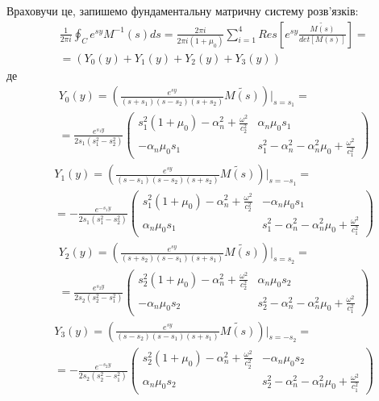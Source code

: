 Враховучи це, запишемо фундаментальну матричну систему розв'язків:
\begin{align*}
    &\frac{1}{2\pi i} \oint_C e^{sy} M^{-1}(s)ds = \frac{2 \pi i}{2 \pi i (1 + \mu_0)} \sum_{i=1}^{4} Res\left[ e^{sy} \frac{\widetilde{M(s)}}{det[M(s)]} \right] = \\
    & = \left(Y_0(y) + Y_1(y) + Y_2(y) + Y_3(y) \right)
\end{align*}
де
\begin{align}
    &Y_0(y) =  \left( \frac{e^{sy}}{(s+s_1)(s - s_2)(s + s_2)} \widetilde{M(s)} \right) \Big|_{s=s_1} = \nonumber \\
    &=\frac{e^{s_1 y}}{2s_1 (s_1^2 - s_2^2)} \begin{pmatrix}
        s_1^2 (1 + \mu_0) -\alpha_n^2 + \frac{\omega^2}{c_2^2} & \alpha_n \mu_0 s_1 \\
        -\alpha_n \mu_0 s_1 & s_1^2 - \alpha_n^2 - \alpha_n^2\mu_0 + \frac{\omega^2}{c_1^2}
    \end{pmatrix}
\end{align}
\begin{align}
    &Y_1(y) =  \left( \frac{e^{sy}}{(s-s_1)(s - s_2)(s + s_2)} \widetilde{M(s)} \right) \Big|_{s=-s_1} = \nonumber \\
    &=-\frac{e^{-s_1 y}}{2s_1 (s_1^2 - s_2^2)} \begin{pmatrix}
        s_1^2 (1 + \mu_0) -\alpha_n^2 + \frac{\omega^2}{c_2^2} & -\alpha_n \mu_0 s_1 \\
        \alpha_n \mu_0 s_1 & s_1^2 - \alpha_n^2 - \alpha_n^2\mu_0 + \frac{\omega^2}{c_1^2}
    \end{pmatrix}
\end{align}
\begin{align}
    &Y_2(y) =  \left( \frac{e^{sy}}{(s+s_2)(s - s_1)(s + s_1)} \widetilde{M(s)} \right) \Big|_{s=s_2} = \nonumber \\
    &=\frac{e^{s_2 y}}{2s_2 (s_2^2 - s_1^2)} \begin{pmatrix}
        s_2^2 (1 + \mu_0) -\alpha_n^2 + \frac{\omega^2}{c_2^2} & \alpha_n \mu_0 s_2 \\
        -\alpha_n \mu_0 s_2 & s_2^2 - \alpha_n^2 - \alpha_n^2\mu_0 + \frac{\omega^2}{c_1^2}
    \end{pmatrix}
\end{align}
\begin{align}
    &Y_3(y) =  \left( \frac{e^{sy}}{(s-s_2)(s - s_1)(s + s_1)} \widetilde{M(s)} \right) \Big|_{s=-s_2} = \nonumber \\
    &=-\frac{e^{-s_2 y}}{2s_2 (s_2^2 - s_1^2)} \begin{pmatrix}
        s_2^2 (1 + \mu_0) -\alpha_n^2 + \frac{\omega^2}{c_2^2} & -\alpha_n \mu_0 s_2 \\
        \alpha_n \mu_0 s_2 & s_2^2 - \alpha_n^2 - \alpha_n^2\mu_0 + \frac{\omega^2}{c_1^2}
    \end{pmatrix}
\end{align}

